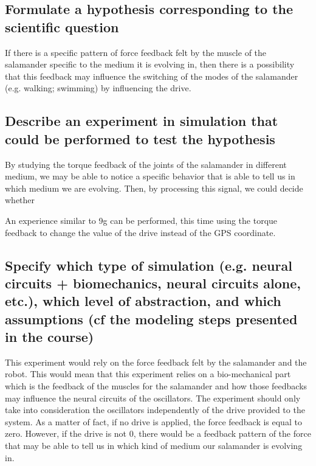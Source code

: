 \documentclass{cmc}
\begin{document}
\subsection{Formulate a hypothesis corresponding to the scientific question}

If there is a specific pattern of force feedback felt by the muscle of the salamander specific to the medium it is evolving in, then there is a possibility that this feedback may influence the switching of the modes of the salamander (e.g. walking; swimming) by influencing the drive.


\subsection{Describe an experiment in simulation that could be
  performed to test the hypothesis}

By studying the torque feedback of the joints of the salamander in different medium, we may be able to notice a specific behavior that is able to tell us in which medium we are evolving. Then, by processing this signal, we could decide whether 

An experience similar to 9g can be performed, this time using the torque feedback to change the value of the drive instead of the GPS coordinate. 

  
 
\subsection{Specify which type of simulation (e.g. neural circuits +
  biomechanics, neural circuits alone, etc.), which level of
  abstraction, and which assumptions (cf the modeling steps presented
  in the course)}
  
  This experiment would rely on the force feedback felt by the salamander and the robot. This would mean that this experiment relies on a bio-mechanical part which is the feedback of the muscles for the salamander and how those feedbacks may influence the neural circuits of the oscillators. The experiment should only take into consideration the oscillators independently of the drive provided to the system. As a matter of fact, if no drive is applied, the force feedback is equal to zero. However, if the drive is not 0, there would be a feedback pattern of the force that may be able to tell us in which kind of medium our salamander is evolving in.
  
\end{document}

